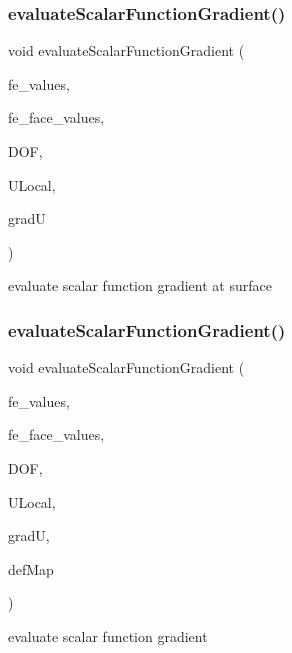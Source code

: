 \subsubsection{\texorpdfstring{evaluateScalarFunctionGradient()}{evaluateScalarFunctionGradient()}\hspace{0.1cm}{\footnotesize\ttfamily [3/4]}}
{\footnotesize\ttfamily void evaluate\+Scalar\+Function\+Gradient (\begin{DoxyParamCaption}\item[{const F\+E\+Values$<$ dim $>$ \&}]{fe\+\_\+values,  }\item[{const F\+E\+Face\+Values$<$ dim $>$ \&}]{fe\+\_\+face\+\_\+values,  }\item[{unsigned int}]{D\+OF,  }\item[{Table$<$ 1, T $>$ \&}]{U\+Local,  }\item[{Table$<$ 2, T $>$ \&}]{gradU }\end{DoxyParamCaption})}

evaluate scalar function gradient at surface \mbox{\label{group___evaluation_functions_gabedd4ae2841d2332ed0df0513b189e34}} 
\subsubsection{\texorpdfstring{evaluateScalarFunctionGradient()}{evaluateScalarFunctionGradient()}\hspace{0.1cm}{\footnotesize\ttfamily [4/4]}}
{\footnotesize\ttfamily void evaluate\+Scalar\+Function\+Gradient (\begin{DoxyParamCaption}\item[{const F\+E\+Values$<$ dim $>$ \&}]{fe\+\_\+values,  }\item[{const F\+E\+Face\+Values$<$ dim $>$ \&}]{fe\+\_\+face\+\_\+values,  }\item[{unsigned int}]{D\+OF,  }\item[{Table$<$ 1, T $>$ \&}]{U\+Local,  }\item[{Table$<$ 2, T $>$ \&}]{gradU,  }\item[{\mbox{\hyperlink{structdeformation_map}{deformation\+Map}}$<$ T, dim $>$ \&}]{def\+Map }\end{DoxyParamCaption})}

evaluate scalar function gradient \mbox{\label{group___evaluation_functions_gadb862d9530a60b8ce5255222778ceeb6}} 
